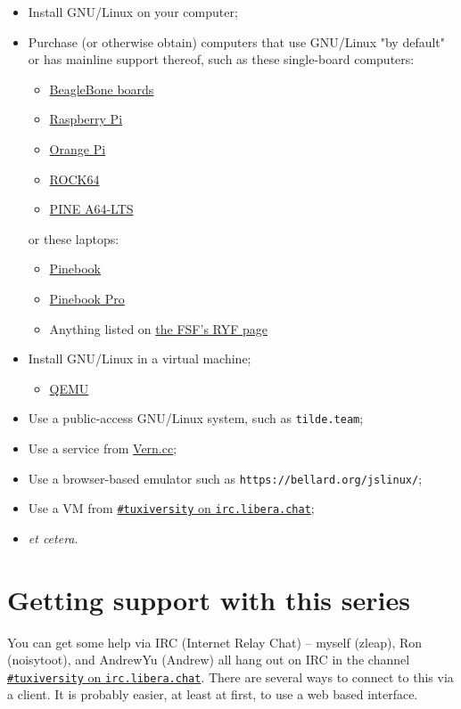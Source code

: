 \documentclass{book}
\newcommand\libera[1]{\href{https://web.libera.chat/?channel=\##1}{\texttt{\##1} on \texttt{irc.libera.chat}}}
\begin{document}
\begin{itemize}
\item Install GNU/Linux on your computer;
\item Purchase (or otherwise obtain) computers that use GNU/Linux "by default" or has mainline support thereof, such as these single-board computers:
  \begin{itemize}
  \item \href{https://beagleboard.org}{BeagleBone boards}
  \item \href{https://www.raspberrypi.org/}{Raspberry Pi}
  \item \href{http://www.orangepi.org/}{Orange Pi}
  \item \href{https://www.pine64.org/devices/single-board-computers/rock64/}{ROCK64}
  \item \href{https://www.pine64.org/devices/single-board-computers/pine-a64-lts/}{PINE A64-LTS}
  \end{itemize}
  or these laptops:
  \begin{itemize}
  \item \href{https://www.pine64.org/pinebook/}{Pinebook}
  \item \href{https://www.pine64.org/pinebook-pro/}{Pinebook Pro}
  \item Anything listed on \href{https://ryf.fsf.org/categories/laptops}{the FSF's RYF page}
  \end{itemize}
\item Install GNU/Linux in a virtual machine;
  \begin{itemize}
  \item \href{https://www.qemu.org/}{QEMU}
  \end{itemize}
\item Use a public-access GNU/Linux system, such as \texttt{tilde.team};
\item Use a service from \href{https://www.vern.cc}{Vern.cc};
\item Use a browser-based emulator such as \texttt{https://bellard.org/jslinux/};
\item Use a VM from \libera{tuxiversity};
\item \textit{et cetera}.
\end{itemize}

\chapter{Getting support with this series}

You can get some help via IRC (Internet Relay Chat) -- myself (zleap), Ron (noisytoot), and AndrewYu (Andrew) all hang out on IRC in the channel \libera{tuxiversity}. There are several ways to connect to this via a client. It is probably easier, at least at first, to use a web based interface.
\end{document}
